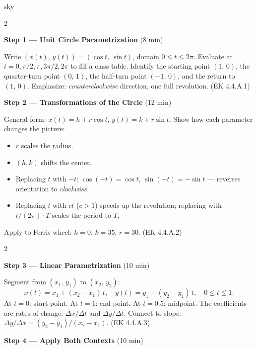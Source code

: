 \documentclass[10pt]{article}
\begin{document}
\begin{skillbox}{sky}
\begin{multicols}{2}

\textbf{Step 1 --- Unit Circle Parametrization} (8 min)

Write $(x(t),\,y(t)) = (\cos t,\,\sin t)$, domain $0 \le t \le 2\pi$.
Evaluate at $t = 0, \pi/2, \pi, 3\pi/2, 2\pi$ to fill a class table.
Identify the starting point $(1,\,0)$, the quarter-turn point $(0,\,1)$,
the half-turn point $(-1,\,0)$, and the return to $(1,\,0)$.
Emphasize: \emph{counterclockwise} direction, one full revolution.
(EK 4.4.A.1)

\columnbreak

\textbf{Step 2 --- Transformations of the Circle} (12 min)

General form: $x(t) = h + r\cos t$, $y(t) = k + r\sin t$.
Show how each parameter changes the picture:
\begin{itemize}[leftmargin=1.2em, itemsep=2pt]
  \item $r$ scales the radius.
  \item $(h,k)$ shifts the center.
  \item Replacing $t$ with $-t$: $\cos(-t)=\cos t$, $\sin(-t)=-\sin t$
    --- reverses orientation to \emph{clockwise}.
  \item Replacing $t$ with $ct$ ($c > 1$) speeds up the revolution;
    replacing with $t/(2\pi) \cdot T$ scales the period to $T$.
\end{itemize}
Apply to Ferris wheel: $h=0$, $k=35$, $r=30$.
(EK 4.4.A.2)

\end{multicols}

\begin{multicols}{2}

\textbf{Step 3 --- Linear Parametrization} (10 min)

Segment from $(x_1,\,y_1)$ to $(x_2,\,y_2)$:
\[
  x(t) = x_1 + (x_2-x_1)\,t,\quad y(t) = y_1 + (y_2-y_1)\,t,\quad 0\le t\le 1.
\]
At $t=0$: start point. At $t=1$: end point. At $t=0.5$: midpoint.
The coefficients are rates of change: $\Delta x / \Delta t$ and $\Delta y / \Delta t$.
Connect to slope: $\Delta y / \Delta x = (y_2-y_1)/(x_2-x_1)$.
(EK 4.4.A.3)

\columnbreak

\textbf{Step 4 --- Apply Both Contexts} (10 min)


\end{multicols}
\end{skillbox}
\end{document}
